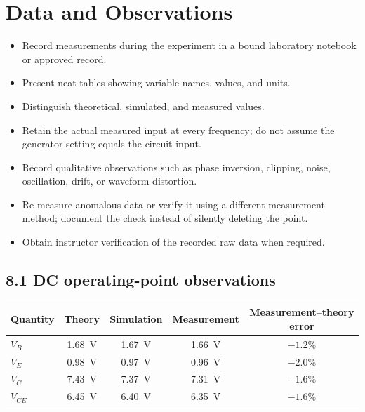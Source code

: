 \documentclass[11pt,a4paper]{article}
\begin{document}
\section{Data and Observations}
\begin{sectionguide}
\begin{itemize}
  \item Record measurements during the experiment in a bound laboratory
        notebook or approved record.
  \item Present neat tables showing variable names, values, and units.
  \item Distinguish theoretical, simulated, and measured values.
  \item Retain the actual measured input at every frequency; do not assume the
        generator setting equals the circuit input.
  \item Record qualitative observations such as phase inversion, clipping,
        noise, oscillation, drift, or waveform distortion.
  \item Re-measure anomalous data or verify it using a different measurement
        method; document the check instead of silently deleting the point.
  \item Obtain instructor verification of the recorded raw data when required.
\end{itemize}
\end{sectionguide}

\subsection*{8.1 DC operating-point observations}

\begin{center}
\begin{tabular}{lcccc}
\toprule
Quantity & Theory & Simulation & Measurement & Measurement--theory error \\
\midrule
$V_B$ & \SI{1.68}{\volt} & \SI{1.67}{\volt} & \SI{1.66}{\volt} & $-1.2\%$ \\
$V_E$ & \SI{0.98}{\volt} & \SI{0.97}{\volt} & \SI{0.96}{\volt} & $-2.0\%$ \\
$V_C$ & \SI{7.43}{\volt} & \SI{7.37}{\volt} & \SI{7.31}{\volt} & $-1.6\%$ \\
$V_{CE}$ & \SI{6.45}{\volt} & \SI{6.40}{\volt} & \SI{6.35}{\volt} & $-1.6\%$ \\
\bottomrule
\end{tabular}
\end{center}
\end{document}
